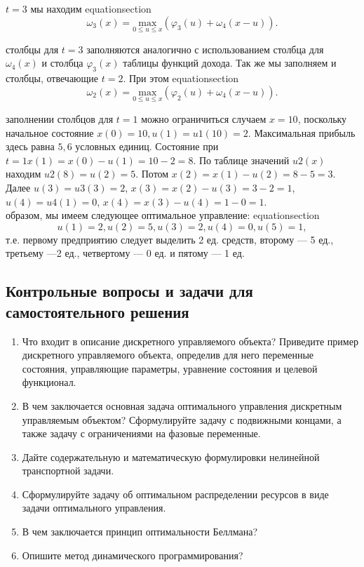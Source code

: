  $t=3$ мы находим\numberwithin
{equation}{section}\begin{equation*}\omega_3(x)=\underset{0\leq u\leq x}{\mathrm{max}}(\varphi_3(u)+\omega_4(x-u)).\end{equation*}

 столбцы для $t=3$ заполняются аналогично с использованием столбца для $\omega_4(x)$ и столбца $\varphi_3(x)$ таблицы функций дохода. Так же мы заполняем и столбцы, отвечающие $t=2$. При этом\numberwithin
{equation}{section}\begin{equation*}\omega_2(x)=\underset{0\leq u\leq x}{\mathrm{max}}(\varphi_2(u)+\omega_4(x-u)).\end{equation*}

 заполнении столбцов для $t=1$ можно ограничиться случаем $x=10$, поскольку начальное состояние $x(0)=10, u(1)=u1(10)=2$. Максимальная прибыль здесь равна $5,6$ условных единиц. Состояние при $t=1  x(1)=x(0)-u(1)=10-2=8$. По таблице значений $u2(x)$ находим  $u2(8)=u(2)=5$. Потом $x(2)=x(1)-u(2)=8-5=3$. Далее $u(3)=u3(3)=2$, $x(3)=x(2)-u(3)=3-2=1$, $u(4)=u4(1)=0$, $x(4)=x(3)-u(4)=1-0=1$.\\
 образом, мы имеем следующее оптимальное управление:\numberwithin
{equation}{section}\begin{equation*}u(1)=2,  u(2)=5,  u(3)=2,  u(4)=0,  u(5)=1,\end{equation*}
т.е. первому предприятию следует выделить 2 ед. средств, второму — 5 ед., третьему —2 ед., четвертому — 0 ед. и пятому — 1 ед.\\

\subsection*{Контрольные вопросы и задачи для самостоятельного решения}
\begin{enumerate}
  \item{Что входит в описание дискретного управляемого объекта? Приведите пример дискретного управляемого объекта, определив для него переменные состояния, управляющие параметры, уравнение состояния и целевой функционал.}
  \item{В чем заключается основная задача оптимального управления дискретным управляемым объектом? Сформулируйте задачу с подвижными концами, а также задачу с ограничениями на фазовые переменные.}
  \item{Дайте содержательную и математическую формулировки нелинейной транспортной задачи.}
  \item{Сформулируйте задачу об оптимальном распределении ресурсов в виде задачи оптимального управления.}
  \item{В чем заключается принцип оптимальности Беллмана?}
  \item{Опишите метод динамического программирования?}
\end{enumerate}

